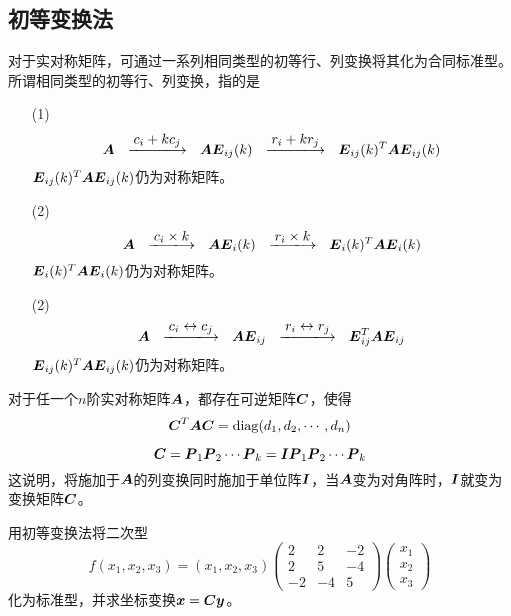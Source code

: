 \subsection{初等变换法}

\begin{frame}
  
    对于实对称矩阵，可通过一系列相同类型的初等行、列变换将其化为合同标准型。
    所谓相同类型的初等行、列变换，指的是
    \begin{itemize}
    \item [(1)]
      $$
      \MA ~~\xlongrightarrow[]{\ds c_i+kc_j} ~~ \MA\ME_{ij}(k)
      ~~\xlongrightarrow[]{\ds r_i+kr_j} ~~ \ME_{ij}(k)^T\MA\ME_{ij}(k)
      $$
      $\boldsymbol{E}_{ij}(k)^T\boldsymbol{A}\boldsymbol{E}_{ij}(k)$仍为对称矩阵。
    \item [(2)]
      $$
      \MA ~~\xlongrightarrow[]{\ds c_i\times k} ~~ \MA\ME_{i}(k)
      ~~\xlongrightarrow[]{\ds r_i\times k} ~~ \ME_{i}(k)^T\MA\ME_{i}(k)
      $$
      $\boldsymbol{E}_{i}(k)^T\boldsymbol{A}\boldsymbol{E}_{i}(k)$仍为对称矩阵。
    \item [(2)]
      $$
      \MA ~~\xlongrightarrow[]{\ds c_i \leftrightarrow c_j} ~~ \MA\ME_{ij}
      ~~\xlongrightarrow[]{\ds r_i\leftrightarrow  r_j} ~~ \ME_{ij}^T\MA\ME_{ij}
      $$
      $\boldsymbol{E}_{ij}(k)^T\boldsymbol{A}\boldsymbol{E}_{ij}(k)$仍为对称矩阵。
    \end{itemize}
  
\end{frame}

\begin{frame}
  
    \begin{dingli}
      对于任一个$n$阶实对称矩阵$\boldsymbol{A}$，都存在可逆矩阵$\boldsymbol{C}$，使得
      $$
      \boldsymbol{C}^T\boldsymbol{A}\boldsymbol{C}=\mathrm{diag}(d_1,d_2,\cdots,d_n)
      $$
    \end{dingli}

    $$
    \boldsymbol{C}=\boldsymbol{P}_1\boldsymbol{P}_2\cdots\boldsymbol{P}_k=\boldsymbol{I}\boldsymbol{P}_1\boldsymbol{P}_2\cdots\boldsymbol{P}_k
    $$
    这说明，将施加于$\boldsymbol{A}$的列变换同时施加于单位阵$\boldsymbol{I}$，当$\boldsymbol{A}$变为对角阵时，$\boldsymbol{I}$就变为变换矩阵$\boldsymbol{C}$。
  
\end{frame}

\begin{frame}
  
    \begin{li}
      用初等变换法将二次型
      $$
      f(x_1,x_2,x_3)=(x_1,x_2,x_3)\left(
      \begin{array}{rrr}
        2&2&-2\\
        2&5&-4\\
        -2&-4&5
      \end{array}
      \right)\left(
      \begin{array}{c}
        x_1\\x_2\\x_3
      \end{array}
      \right)
      $$
      化为标准型，并求坐标变换${\boldsymbol{x}}=\boldsymbol{C}{\boldsymbol{y}}$。
    \end{li}
  
\end{frame}


